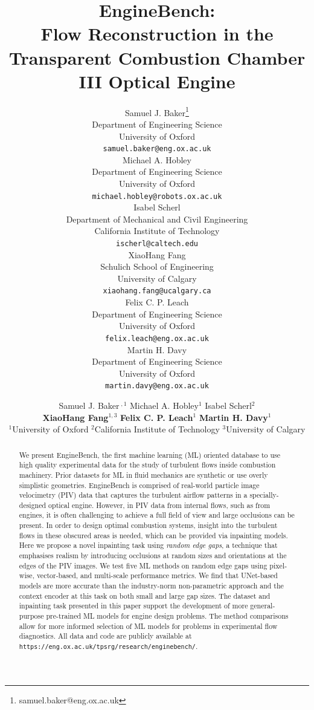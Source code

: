 \documentclass{article}
\title{EngineBench: \\ Flow Reconstruction in the Transparent Combustion Chamber III Optical Engine}
\author{%
  Samuel J. Baker\thanks{samuel.baker@eng.ox.ac.uk} \\
  Department of Engineering Science\\
  University of Oxford\\
  \texttt{samuel.baker@eng.ox.ac.uk} \\
  \And
  Michael A. Hobley \\
  Department of Engineering Science\\
  University of Oxford\\
  \texttt{michael.hobley@robots.ox.ac.uk} \\
  \And
  Isabel Scherl \\
  Department of Mechanical and Civil Engineering\\
  California Institute of Technology\\
  \texttt{ischerl@caltech.edu} \\
  \And
  XiaoHang Fang \\
  Schulich School of Engineering\\ 
  University of Calgary\\
  \texttt{xiaohang.fang@ucalgary.ca} \\
  \And
  Felix C. P. Leach \\
  Department of Engineering Science\\
  University of Oxford\\
  \texttt{felix.leach@eng.ox.ac.uk} \\
  \And
  Martin H. Davy \\
  Department of Engineering Science\\
  University of Oxford\\
  \texttt{martin.davy@eng.ox.ac.uk} \\
}
\author{%
Samuel J. Baker\footnotemark{}$^{\;,1}$ \quad Michael A. Hobley$^{1}$ \quad Isabel Scherl$^2$ \\ \textbf{XiaoHang Fang}$^{1,3}$ \quad \textbf{Felix C. P. Leach}$^1$ \quad
\textbf{Martin H. Davy}$^1$ \\
$^1$University of Oxford \quad $^2$California Institute of Technology \quad $^3$University of Calgary
}
\begin{document}
\maketitle

\begin{abstract}
We present EngineBench, the first machine learning (ML) oriented database to use high quality experimental data for the study of turbulent flows inside combustion machinery.
Prior datasets for ML in fluid mechanics are synthetic or use overly simplistic geometries.
EngineBench is comprised of real-world particle image velocimetry (PIV) data that captures the turbulent airflow patterns in a specially-designed optical engine.
However, in PIV data from internal flows, such as from engines, it is often challenging to achieve a full field of view and large occlusions can be present.
In order to design optimal combustion systems, insight into the turbulent flows in these obscured areas is needed, which can be provided via inpainting models. 
Here we propose a novel inpainting task using \textit{random edge gaps},  a technique that emphasises realism by introducing occlusions at random sizes and orientations at the edges of the PIV images.
We test five ML methods on random edge gaps using pixel-wise, vector-based, and multi-scale performance metrics.
We find that UNet-based models are more accurate than the industry-norm non-parametric approach and the context encoder at this task on both small and large gap sizes.
The dataset and inpainting task presented in this paper support the development of more general-purpose pre-trained ML models for engine design problems.
The method comparisons allow for more informed selection of ML models  for problems in experimental flow diagnostics.
All data and code are publicly available at \texttt{https://eng.ox.ac.uk/tpsrg/research/enginebench/}.

\end{abstract}
\end{document}
